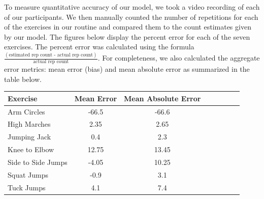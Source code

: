 To measure quantitative accuracy of our model, we took a video recording of each of our participants. 
We then manually counted the number of repetitions for each of the exercises in our routine and compared them to the count estimates given by our model. 
The figures below display the percent error for each of the seven exercises. 
The percent error was calculated using the formula $\frac{(\text{estimated rep count - actual rep count})}{\text{actual rep count}}$.
For completeness, we also calculated the aggregate error metrics: mean error (bias) and mean absolute error as summarized in the table below.

\begin{tabular}{l*{6}{c}r}
Exercise              		& Mean Error & Mean Absolute Error  \\
\hline
Arm Circles 			& -66.5 & -66.6 \\
High Marches            	& 2.35 & 2.65 \\
Jumping Jack           	& 0.4 & 2.3  \\
Knee to Elbow     		& 12.75 & 13.45  \\
Side to Side Jumps    	& -4.05 & 10.25  \\
Squat Jumps	    		& -0.9 & 3.1  \\
Tuck Jumps	    		& 4.1 & 7.4  \\
\end{tabular}

